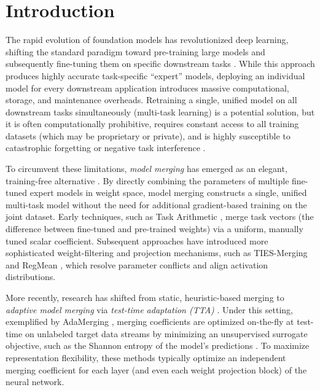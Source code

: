 \section{Introduction}
\label{sec:intro}

The rapid evolution of foundation models has revolutionized deep learning, shifting the standard paradigm toward pre-training large models and subsequently fine-tuning them on specific downstream tasks \cite{radford2021clip, dosovitskiy2020vit}. While this approach produces highly accurate task-specific ``expert'' models, deploying an individual model for every downstream application introduces massive computational, storage, and maintenance overheads. Retraining a single, unified model on all downstream tasks simultaneously (multi-task learning) is a potential solution, but it is often computationally prohibitive, requires constant access to all training datasets (which may be proprietary or private), and is highly susceptible to catastrophic forgetting or negative task interference \cite{french1999catastrophic, kirkpatrick2017overcoming}.

To circumvent these limitations, \emph{model merging} has emerged as an elegant, training-free alternative \cite{ilharco2022editing, wortsman2022model}. By directly combining the parameters of multiple fine-tuned expert models in weight space, model merging constructs a single, unified multi-task model without the need for additional gradient-based training on the joint dataset. Early techniques, such as Task Arithmetic \cite{ilharco2022editing}, merge task vectors (the difference between fine-tuned and pre-trained weights) via a uniform, manually tuned scalar coefficient. Subsequent approaches have introduced more sophisticated weight-filtering and projection mechanisms, such as TIES-Merging \cite{yadav2023ties} and RegMean \cite{jin2022regmean}, which resolve parameter conflicts and align activation distributions.

More recently, research has shifted from static, heuristic-based merging to \emph{adaptive model merging} via \emph{test-time adaptation (TTA)} \cite{yang2024adamerging, jung2026symerge}. Under this setting, exemplified by AdaMerging \cite{yang2024adamerging}, merging coefficients are optimized on-the-fly at test-time on unlabeled target data streams by minimizing an unsupervised surrogate objective, such as the Shannon entropy of the model's predictions \cite{wang2020tent}. To maximize representation flexibility, these methods typically optimize an independent merging coefficient for each layer (and even each weight projection block) of the neural network.

